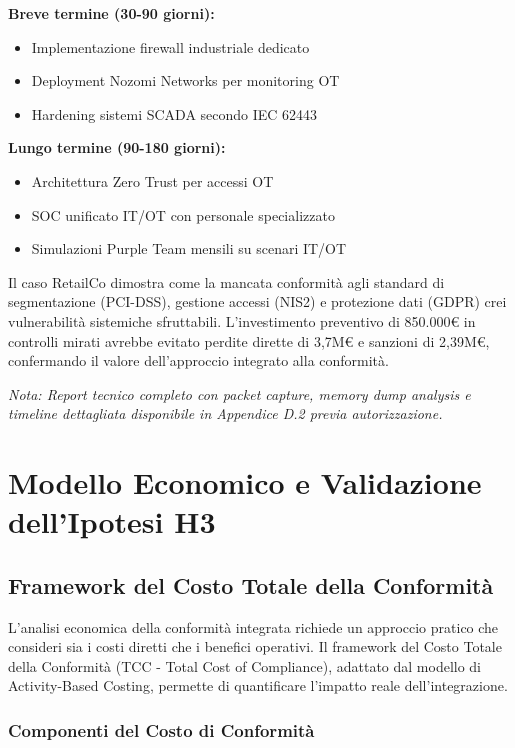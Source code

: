 \textbf{Breve termine (30-90 giorni):}
\begin{itemize}
    \item Implementazione firewall industriale dedicato
    \item Deployment Nozomi Networks per monitoring OT
    \item Hardening sistemi SCADA secondo IEC 62443
\end{itemize}

\textbf{Lungo termine (90-180 giorni):}
\begin{itemize}
    \item Architettura Zero Trust per accessi OT
    \item SOC unificato IT/OT con personale specializzato
    \item Simulazioni Purple Team mensili su scenari IT/OT
\end{itemize}

Il caso RetailCo dimostra come la mancata conformità agli standard di segmentazione (PCI-DSS), gestione accessi (NIS2) e protezione dati (GDPR) crei vulnerabilità sistemiche sfruttabili. L'investimento preventivo di 850.000€ in controlli mirati avrebbe evitato perdite dirette di 3,7M€ e sanzioni di 2,39M€, confermando il valore dell'approccio integrato alla conformità.

\textit{Nota: Report tecnico completo con packet capture, memory dump analysis e timeline dettagliata disponibile in Appendice D.2 previa autorizzazione.}

\section{\texorpdfstring{\textbf{Modello Economico e Validazione dell'Ipotesi H3}}{4.6 - Modello Economico e Validazione dell'Ipotesi H3}}

\subsection{Framework del Costo Totale della Conformità}

L'analisi economica della conformità integrata richiede un approccio pratico che consideri sia i costi diretti che i benefici operativi. Il framework del Costo Totale della Conformità (TCC - Total Cost of Compliance), adattato dal modello di Activity-Based Costing\autocite{Kaplan2007}, permette di quantificare l'impatto reale dell'integrazione.

\subsubsection{Componenti del Costo di Conformità}

